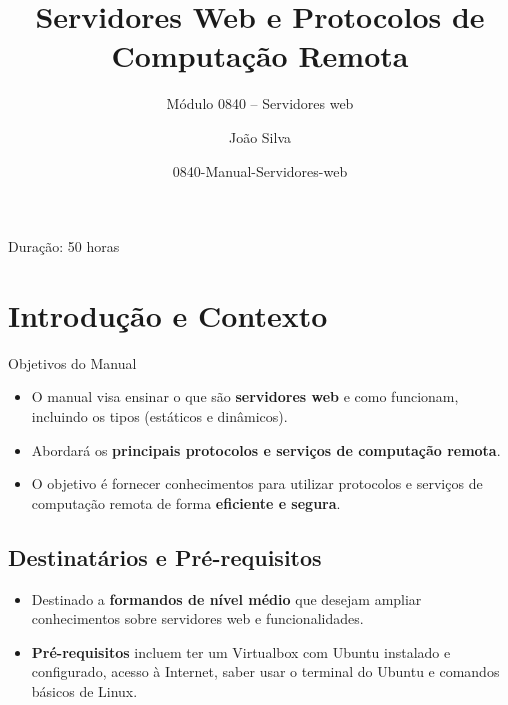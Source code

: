 \documentclass{beamer}
\title{Servidores Web e Protocolos de Computação Remota}
\subtitle{Módulo 0840 – Servidores web}
\author{João Silva}
\institute{Curso Técnico/a de Informática – Instalação e Gestão de Redes}
\date{0840-Manual-Servidores-web}
\begin{document}
	
	\begin{frame}
		\titlepage
		\vspace{0.5cm}
		{\small Duração: 50 horas}
	\end{frame}
	
	\section{Introdução e Contexto}
	\begin{frame}{Objetivos do Manual}
		\begin{itemize}
			\item O manual visa ensinar o que são \textbf{servidores web} e como funcionam, incluindo os tipos (estáticos e dinâmicos).
			\item Abordará os \textbf{principais protocolos e serviços de computação remota}.
			\item O objetivo é fornecer conhecimentos para utilizar protocolos e serviços de computação remota de forma \textbf{eficiente e segura}.
		\end{itemize}
		
		\subsection*{Destinatários e Pré-requisitos}
		\begin{itemize}
			\item Destinado a \textbf{formandos de nível médio} que desejam ampliar conhecimentos sobre servidores web e funcionalidades.
			\item \textbf{Pré-requisitos} incluem ter um Virtualbox com Ubuntu instalado e configurado, acesso à Internet, saber usar o terminal do Ubuntu e comandos básicos de Linux.
		\end{itemize}
	\end{frame}
	
\end{document}
